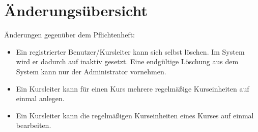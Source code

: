 \chapter*{Änderungsübersicht}
Änderungen gegenüber dem Pflichtenheft:
\begin{itemize}
	\item Ein registrierter Benutzer/Kursleiter kann sich selbst löschen. Im System wird er dadurch auf inaktiv gesetzt. Eine endgültige Löschung aus dem System kann nur der Administrator vornehmen.
	\item Ein Kursleiter kann für einen Kurs mehrere regelmäßige Kurseinheiten auf einmal anlegen.
	\item Ein Kursleiter kann die regelmäßigen Kurseinheiten eines Kurses auf einmal bearbeiten.
\end{itemize} 